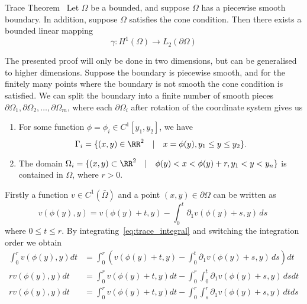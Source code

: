 \begin{thmx}{Trace Theorem}~\label{thm:trace}
    Let $\Omega$ be a bounded, and suppose $\Omega$ has a piecewise smooth boundary. In addition, suppose $\Omega$ satisfies the cone condition. Then there exists a bounded linear mapping %
    \begin{equation*}
        \gamma : H^1(\Omega) \to L_2(\partial \Omega)
    \end{equation*}
\end{thmx}
\begin{bev}
    The presented proof will only be done in two dimensions, but can be generalised to higher dimensions.
    Suppose the boundary is piecewise smooth, and for the finitely many points where the boundary is not smooth the cone condition is satisfied. We can split the boundary into a finite number of smooth pieces $\partial \Omega_1, \partial \Omega_2, \dots, \partial \Omega_m$, where each $\partial \Omega_i$ after rotation of the coordinate system gives us
    \begin{enumerate}
        \item For some function $\phi = \phi_i \in C^1[y_1, y_2]$, we have
            \[ \Gamma_i = \{ (x,y) \in \RR^2 \quad | \quad x = \phi(y), y_1 \leq y \leq y_2 \}. \]
        \item The domain $\Omega_i = \{ (x,y) \subset \RR^2 \quad | \quad \phi(y) < x <\phi(y) + r, y_1 < y < y_n \}$ is contained in $\Omega$, where $r > 0$. %
    \end{enumerate}
    Firstly a function $v \in C^1(\bar{\Omega})$ and a point $(x,y) \in \partial \Omega$ can be written as
    \begin{equation}
            v(\phi(y), y) = v(\phi(y) + t, y) - \int_0^t \partial_1 v(\phi(y) + s, y) \, ds~\label{eq:trace_integral}
    \end{equation}
    where $0 \leq t \leq r$. By integrating~\eqref{eq:trace_integral} and switching the integration order we obtain 
    \begin{align*}
        \int_0^r v(\phi(y), y) dt &= \int_0^r \left(   v(\phi(y) + t, y) - \int_0^t \partial_1 v(\phi(y) + s, y) \, ds \right) dt \\
        r v(\phi(y), y) dt &= \int_0^r   v(\phi(y) + t, y) dt - \int_0^r \int_0^t \partial_1 v(\phi(y) + s, y) \, ds dt \\
        r v(\phi(y), y) dt &= \int_0^r   v(\phi(y) + t, y) dt - \int_0^r \int_s^r \partial_1 v(\phi(y) + s, y) \, dt ds \\

\end{align*}
\end{bev}
